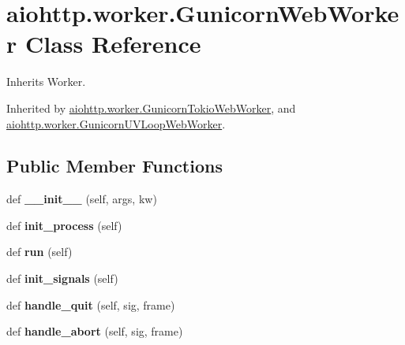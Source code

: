 \hypertarget{classaiohttp_1_1worker_1_1_gunicorn_web_worker}{}\section{aiohttp.\+worker.\+Gunicorn\+Web\+Worker Class Reference}
\label{classaiohttp_1_1worker_1_1_gunicorn_web_worker}


Inherits Worker.



Inherited by \hyperlink{classaiohttp_1_1worker_1_1_gunicorn_tokio_web_worker}{aiohttp.\+worker.\+Gunicorn\+Tokio\+Web\+Worker}, and \hyperlink{classaiohttp_1_1worker_1_1_gunicorn_u_v_loop_web_worker}{aiohttp.\+worker.\+Gunicorn\+U\+V\+Loop\+Web\+Worker}.

\subsection*{Public Member Functions}
\begin{DoxyCompactItemize}
\item 
\mbox{\label{classaiohttp_1_1worker_1_1_gunicorn_web_worker_ab65f37d279b25680e18dd56445224519}} 
def {\bfseries \+\_\+\+\_\+init\+\_\+\+\_\+} (self, args, kw)
\item 
\mbox{\label{classaiohttp_1_1worker_1_1_gunicorn_web_worker_a986849125bff568c6e4bccdb8410f601}} 
def {\bfseries init\+\_\+process} (self)
\item 
\mbox{\label{classaiohttp_1_1worker_1_1_gunicorn_web_worker_abf3c421fc6a04cd69ae0f239b2f14687}} 
def {\bfseries run} (self)
\item 
\mbox{\label{classaiohttp_1_1worker_1_1_gunicorn_web_worker_a772febc5cf26166124b10e4c22366fa9}} 
def {\bfseries init\+\_\+signals} (self)
\item 
\mbox{\label{classaiohttp_1_1worker_1_1_gunicorn_web_worker_a3ced6240d4d0656e083dbf4f6d9d5d4d}} 
def {\bfseries handle\+\_\+quit} (self, sig, frame)
\item 
\mbox{\label{classaiohttp_1_1worker_1_1_gunicorn_web_worker_a1c72a491172474b4c4c997b5c1701dbd}} 
def {\bfseries handle\+\_\+abort} (self, sig, frame)
\end{DoxyCompactItemize}
